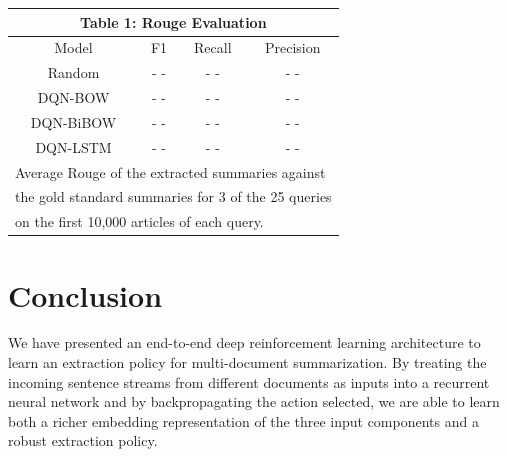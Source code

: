 \documentclass[12pt]{article}
\begin{document}
\begin{center}
\begin{tabular}{  c | c | c | c  }
	\multicolumn{4}{c}{\textbf{Table 1}: Rouge Evaluation} \\
	\hline
	Model  & F1 & Recall & Precision  \\ \hline \hline
	Random  & \color{ red} - - & \color{ red} - -  & \color{ red} - -\\ 
	DQN-BOW  & \color{ red} - - & \color{ red} - -  & \color{ red} - -\\
	DQN-BiBOW  & \color{ red} - - & \color{ red} - -  & \color{ red} - -\\
	DQN-LSTM  & \color{ red}  - - & \color{ red} - -  & \color{ red} - -\\ \hline
	\hline
	\multicolumn{4}{l}{\footnotesize Average Rouge of the extracted summaries against} \\
	\multicolumn{4}{l}{\footnotesize the gold standard summaries for 3 of the 25 queries} \\
	\multicolumn{4}{l}{\footnotesize  on the first 10,000 articles of each query.} \\
	\hline
\end{tabular}
\end{center}

\section{Conclusion}
We have presented an end-to-end deep reinforcement learning architecture to learn an extraction policy for multi-document summarization. By treating the incoming sentence streams from different documents as inputs into a recurrent neural network and by backpropagating the action selected, we are able to learn both a richer embedding representation of the three input components and a robust extraction policy.


\end{document}
